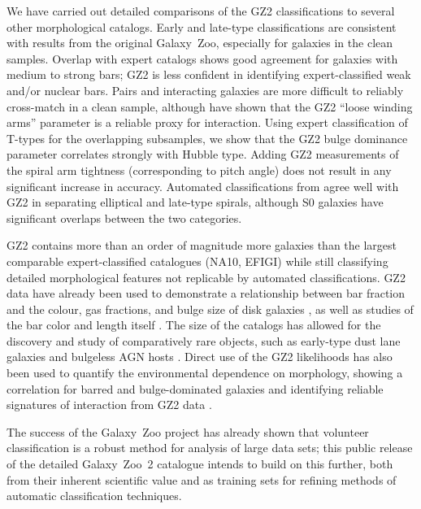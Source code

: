 \documentclass[useAMS,usenatbib]{mn2e}
\begin{document}
We have carried out detailed comparisons of the GZ2 classifications to several other morphological catalogs. Early and late-type classifications are consistent with results from the original Galaxy~Zoo, especially for galaxies in the clean samples. Overlap with expert catalogs \citep{nai10,bai11} shows good agreement for galaxies with medium to strong bars; GZ2 is less confident in identifying expert-classified weak and/or nuclear bars. Pairs and interacting galaxies are more difficult to reliably cross-match in a clean sample, although \citet{cas13} have shown that the GZ2 ``loose winding arms'' parameter is a reliable proxy for interaction. Using expert classification of T-types for the overlapping subsamples, we show that the GZ2 bulge dominance parameter correlates strongly with Hubble type. Adding GZ2 measurements of the spiral arm tightness (corresponding to pitch angle) does not result in any significant increase in accuracy. Automated classifications from \citet{hue11} agree well with GZ2 in separating elliptical and late-type spirals, although S0 galaxies have significant overlaps between the two categories. 

GZ2 contains more than an order of magnitude more galaxies than the largest comparable expert-classified catalogues (NA10, EFIGI) while still classifying detailed morphological features not replicable by automated classifications. GZ2 data have already been used to demonstrate a relationship between bar fraction and the colour, gas fractions, and bulge size of disk galaxies \citep{mas11c,mas12a}, as well as studies of the bar color and length itself \citet{hoy11}. The size of the catalogs has allowed for the discovery and study of comparatively rare objects, such as early-type dust lane galaxies \citep{kav12a} and bulgeless AGN hosts \citep{sim13}. Direct use of the GZ2 likelihoods has also been used to quantify the environmental dependence on morphology, showing a correlation for barred and bulge-dominated galaxies \citep{ski12} and identifying reliable signatures of interaction from GZ2 data \citep{cas13}. 

The success of the Galaxy~Zoo project has already shown that volunteer classification is a robust method for analysis of large data sets; this public release of the detailed Galaxy~Zoo~2 catalogue intends to build on this further, both from their inherent scientific value and as training sets for refining methods of automatic classification techniques. 

\end{document}

